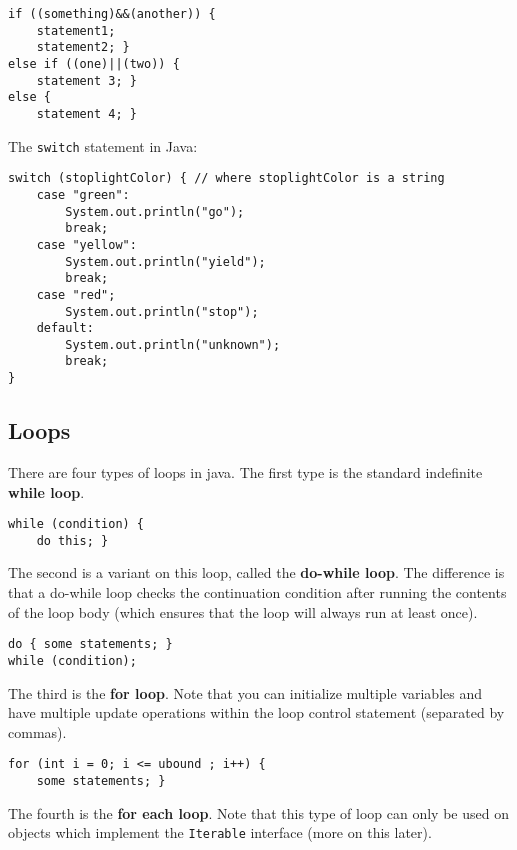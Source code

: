\documentclass{article}
\begin{document}
\begin{flushleft}
\begin{verbatim}
if ((something)&&(another)) {
    statement1;
    statement2; }
else if ((one)||(two)) {
    statement 3; }
else {
    statement 4; }
\end{verbatim}

The \texttt{switch} statement in Java:

\begin{verbatim}
switch (stoplightColor) { // where stoplightColor is a string
    case "green":
        System.out.println("go");
        break;
    case "yellow":
        System.out.println("yield");
        break;
    case "red";
        System.out.println("stop");
    default:
        System.out.println("unknown");
        break;
}
\end{verbatim}

\subsection{Loops}

There are four types of loops in java. The first type is the standard indefinite \textbf{while loop}.

\begin{verbatim}
while (condition) {
    do this; }
\end{verbatim}

The second is a variant on this loop, called the \textbf{do-while loop}. The difference is that a do-while loop checks the continuation condition after running the contents of the loop body (which ensures that the loop will always run at least once).

\begin{verbatim}
do { some statements; }
while (condition);
\end{verbatim}

The third is the \textbf{for loop}. Note that you can initialize multiple variables and have multiple update operations within the loop control statement (separated by commas).

\begin{verbatim}
for (int i = 0; i <= ubound ; i++) {
    some statements; }
\end{verbatim}

The fourth is the \textbf{for each loop}. Note that this type of loop can only be used on objects which implement the \texttt{Iterable} interface (more on this later).


\end{flushleft}
\end{document}
